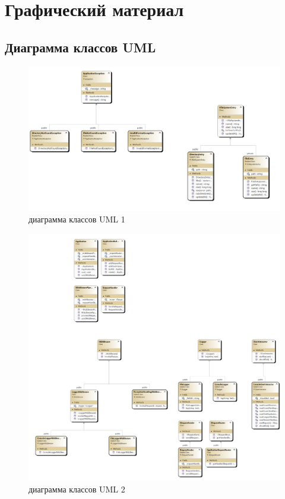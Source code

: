\chapter{Графический материал}\label{appendix-diagrams}							%

\section{Диаграмма классов UML}
\begin{figure}[ht] 
	\center
	\includegraphics [scale=0.4] {my_folder/images/uml2.png}
	\caption{диаграмма классов UML 1} 
	\label{fig:uml1}  
\end{figure}\newpage
\begin{figure}[ht] 
	\center
	\includegraphics [scale=0.34] {my_folder/images/uml4.png}
	\caption{диаграмма классов UML 2} 
	\label{fig:uml2}  
\end{figure}\newpage
